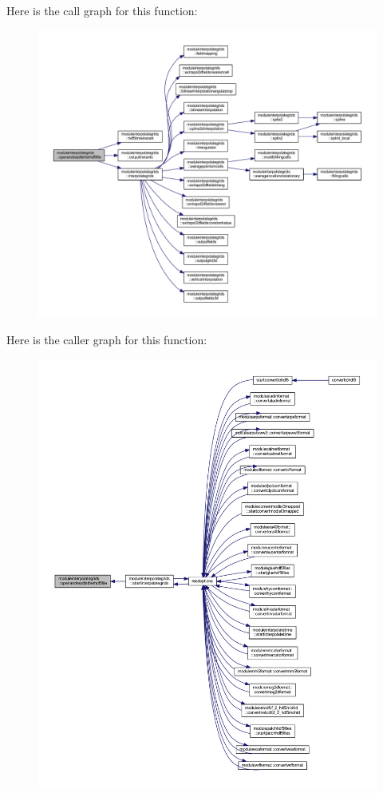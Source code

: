 Here is the call graph for this function\+:\nopagebreak
\begin{figure}[H]
\begin{center}
\leavevmode
\includegraphics[width=350pt]{namespacemoduleinterpolategrids_ae103d8313a774b19abd42423e41be969_cgraph}
\end{center}
\end{figure}
Here is the caller graph for this function\+:\nopagebreak
\begin{figure}[H]
\begin{center}
\leavevmode
\includegraphics[width=350pt]{namespacemoduleinterpolategrids_ae103d8313a774b19abd42423e41be969_icgraph}
\end{center}
\end{figure}
